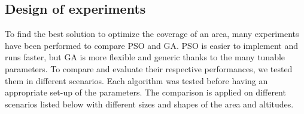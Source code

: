 
\subsection{Design of experiments }\label{sec:DoE}


To find the best solution to optimize the coverage of an area, many experiments have been performed to compare PSO and GA. PSO is easier to implement and runs faster, but GA is more flexible and generic thanks to the many tunable parameters. 
To compare and evaluate their respective performances, we tested them in different scenarios. Each algorithm was tested before having an appropriate set-up of the parameters. 
The comparison is applied on different scenarios %
 listed below with different sizes and shapes of the area and altitudes. 




